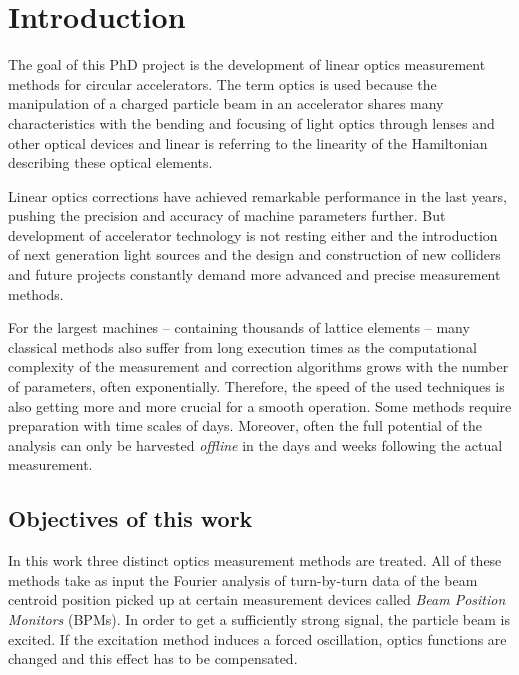 \chapter{Introduction}

\lohead{\leftmark}
\rehead{\rightmark}
\setcounter{page}{1}


The goal of this PhD project is the development of linear optics measurement methods for
circular accelerators.
The term optics is used because the manipulation of a charged particle beam in an accelerator shares
many characteristics with the bending and focusing of light optics through lenses and other optical
devices and linear is referring to the linearity of the Hamiltonian describing these optical elements.

Linear optics corrections have achieved remarkable performance in the last years,
pushing the precision and accuracy of machine parameters further.
But development of accelerator technology is not resting either and the introduction of
next generation light sources and the design and construction of new colliders and future projects
constantly demand more advanced and precise measurement methods.

For the largest machines -- containing thousands of lattice elements -- many classical methods also suffer from 
long execution times as the computational complexity of the measurement and correction algorithms grows
with the number of parameters, often exponentially. 
Therefore, the speed of the used techniques is also getting more and more crucial for a smooth operation. 
Some methods require preparation with time scales of days.
Moreover, often the full potential of the analysis can only be harvested \emph{offline} in the days and
weeks following the actual measurement.

\section{Objectives of this work}

In this work three distinct optics measurement methods are treated. All of these methods take as input the
Fourier analysis of turn-by-turn data of the beam centroid position picked up at certain measurement
devices called \emph{Beam Position Monitors} (BPMs). In order to get a sufficiently strong signal, the
particle beam is excited. If the excitation method induces a forced oscillation, optics functions are changed
and this effect has to be compensated.

